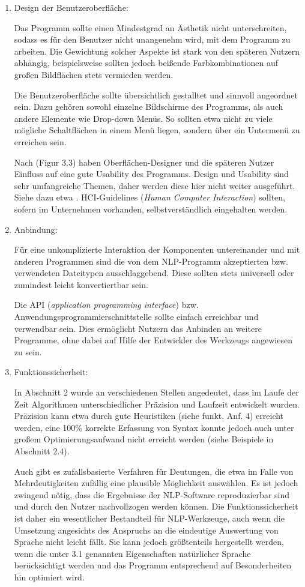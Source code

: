 \documentclass[12pt]{report}
\begin{document}
\begin{enumerate}
\item Design der Benutzeroberfläche:

Das Programm sollte einen Mindestgrad an Ästhetik nicht unterschreiten, sodass es für den Benutzer nicht unangenehm wird, mit dem Programm zu arbeiten. Die Gewichtung solcher Aspekte ist stark von den späteren Nutzern abhängig, beispielsweise sollten jedoch \glqq  beißende\grqq{} Farbkombinationen auf großen Bildflächen stets vermieden werden. 

Die Benutzeroberfläche sollte übersichtlich gestalltet und sinnvoll angeordnet sein. Dazu gehören sowohl einzelne Bildschirme des Programms, als auch andere Elemente wie Drop-down Menüs. So sollten etwa nicht zu viele mögliche Schaltflächen in einem Menü liegen, sondern über ein Untermenü zu erreichen sein. 

Nach \cite{hm13} (Figur 3.3) haben Oberflächen-Designer und die späteren Nutzer Einfluss auf eine gute Usability des Programms. Design und Usability sind sehr umfangreiche Themen, daher werden diese hier nicht weiter ausgeführt. Siehe dazu etwa \cite{shn10}. HCI-Guidelines (\textit{Human Computer Interaction}) sollten, sofern im Unternehmen vorhanden, selbstverständlich eingehalten werden.

\item Anbindung:

Für eine unkomplizierte Interaktion der Komponenten untereinander und mit anderen Programmen sind die von dem NLP-Programm akzeptierten bzw. verwendeten Dateitypen ausschlaggebend. Diese sollten stets universell oder zumindest leicht konvertiertbar sein. 

Die API (\textit{application programming interface}) bzw. Anwendungsprogrammierschnittstelle sollte einfach erreichbar und verwendbar sein. Dies ermöglicht Nutzern das Anbinden an weitere Programme, ohne dabei auf Hilfe der Entwickler des Werkzeugs angewiesen zu sein. 
 
\item Funktionssicherheit:

In Abschnitt 2 wurde an verschiedenen Stellen angedeutet, dass im Laufe der Zeit Algorithmen unterschiedlicher Präzision und Laufzeit entwickelt wurden. Präzision kann etwa durch gute Heuristiken (siehe funkt. Anf. 4) erreicht werden, eine 100\% korrekte Erfassung von Syntax konnte jedoch auch unter großem Optimierungsaufwand nicht erreicht werden (siehe Beispiele in Abschnitt 2.4).  

Auch gibt es zufallsbasierte Verfahren für Deutungen, die etwa im Falle von Mehrdeutigkeiten zufällig eine plausible Möglichkeit auswählen. Es ist jedoch zwingend nötig, dass die Ergebnisse der NLP-Software reproduzierbar sind und durch den Nutzer nachvollzogen werden können. Die Funktionssicherheit ist daher ein wesentlicher Bestandteil für NLP-Werkzeuge, auch wenn die Umsetzung angesichts des Anspruchs an die eindeutige Auswertung von Sprache nicht leicht fällt. Sie kann jedoch größtenteils hergestellt werden, wenn die unter 3.1 genannten Eigenschaften natürlicher Sprache berücksichtigt werden und das Programm entsprechend auf Besonderheiten hin optimiert wird.


\end{enumerate}
\end{document}
